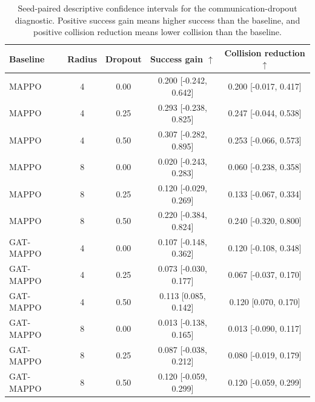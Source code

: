 \begin{table}[t]
\centering
\caption{Seed-paired descriptive confidence intervals for the communication-dropout diagnostic. Positive success gain means higher success than the baseline, and positive collision reduction means lower collision than the baseline.}
\label{tab:comm_dropout_paired_ci}
\begin{tabular}{lcccc}
\toprule
Baseline & Radius & Dropout & Success gain $\uparrow$ & Collision reduction $\uparrow$ \\
\midrule
MAPPO & 4 & 0.00 & 0.200 [-0.242, 0.642] & 0.200 [-0.017, 0.417] \\
MAPPO & 4 & 0.25 & 0.293 [-0.238, 0.825] & 0.247 [-0.044, 0.538] \\
MAPPO & 4 & 0.50 & 0.307 [-0.282, 0.895] & 0.253 [-0.066, 0.573] \\
MAPPO & 8 & 0.00 & 0.020 [-0.243, 0.283] & 0.060 [-0.238, 0.358] \\
MAPPO & 8 & 0.25 & 0.120 [-0.029, 0.269] & 0.133 [-0.067, 0.334] \\
MAPPO & 8 & 0.50 & 0.220 [-0.384, 0.824] & 0.240 [-0.320, 0.800] \\
\midrule
GAT-MAPPO & 4 & 0.00 & 0.107 [-0.148, 0.362] & 0.120 [-0.108, 0.348] \\
GAT-MAPPO & 4 & 0.25 & 0.073 [-0.030, 0.177] & 0.067 [-0.037, 0.170] \\
GAT-MAPPO & 4 & 0.50 & 0.113 [0.085, 0.142] & 0.120 [0.070, 0.170] \\
GAT-MAPPO & 8 & 0.00 & 0.013 [-0.138, 0.165] & 0.013 [-0.090, 0.117] \\
GAT-MAPPO & 8 & 0.25 & 0.087 [-0.038, 0.212] & 0.080 [-0.019, 0.179] \\
GAT-MAPPO & 8 & 0.50 & 0.120 [-0.059, 0.299] & 0.120 [-0.059, 0.299] \\
\bottomrule
\end{tabular}
\end{table}
